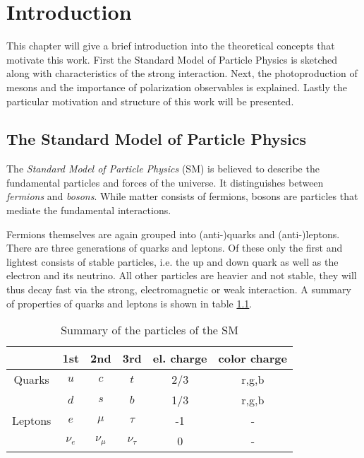 
\chapter{Introduction}
\label{sec:intro}
This chapter will give a brief introduction into the theoretical concepts that motivate this work. First the Standard Model of Particle Physics is sketched along with characteristics of the strong interaction. Next, the photoproduction of mesons and the importance of polarization observables is explained. Lastly the particular motivation and structure of this work will be presented.
\section{The Standard Model of Particle Physics}
The \emph{Standard Model of Particle Physics} (SM) is believed to describe the fundamental particles and forces of the universe. It distinguishes between \emph{fermions} and \emph{bosons}. While matter consists of fermions, bosons are particles that mediate the fundamental interactions. 

Fermions themselves are again grouped into (anti-)quarks and (anti-)leptons. There are three generations of quarks and leptons. Of these only the first and lightest consists of stable particles, i.e. the up and down quark as well as the electron and its neutrino. All other particles are heavier and not stable, they will thus decay fast via the strong, electromagnetic or weak interaction. A summary of properties of quarks and leptons is shown in table \ref{tab:sm0}.
\begin{table}[htbp]
	\centering
	\begin{tabular}{cccccc}
		\toprule
		&1st & 2nd & 3rd & el. charge& color charge\\
		\hline
		Quarks & $u$&$c$&$t$& 2/3 & r,g,b\\
		&$d$&$s$&$b$& 1/3 & r,g,b\\
		Leptons& $e$&$\mu$&$\tau$&-1& -\\
		& $\nu_e$&$\nu_\mu$&$\nu_\tau$&0&-\\
		\bottomrule
		
	\end{tabular}
\caption{Summary of the particles of the SM}
\label{tab:sm0}
\end{table}

